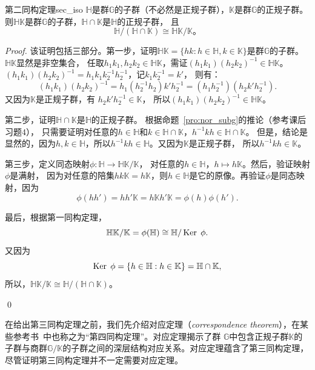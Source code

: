 \begin{theorem}{第二同构定理}{sec_iso}
$\mathbb{H}$是群$\mathbb{G}$的子群（不必然是正规子群），$\mathbb{K}$是群$\mathbb{G}$的正规子群。
则$\mathbb{H} \mathbb{K}$是群$\mathbb{G}$的子群，$\mathbb{H}\cap \mathbb{K}$是$\mathbb{H}$的正规子群，
且
\[\mathbb{H} / (\mathbb{H}\cap \mathbb{K}) \cong \mathbb{H}\mathbb{K}/\mathbb{K}\text{。}\]
\end{theorem}
\begin{proof}
该证明包括三部分。第一步，证明$\mathbb{H} \mathbb{K} = \{hk: h \in \mathbb{H}, k \in \mathbb{K}\}$是群$\mathbb{G}$的子群。
$\mathbb{H} \mathbb{K} $显然是非空集合，
任取$h_1 k_1 , h_2 k_2 \in \mathbb{H} \mathbb{K}$，需证$(h_1 k_1)  (h_2 k_2)^{-1} \in \mathbb{H} \mathbb{K}$。
$(h_1 k_1)  (h_2 k_2)^{-1} = h_1 k_1 k_2^{-1} h_2^{-1}$，记$k_1 k_2^{-1} = k'$，
则有：
\[ (h_1 k_1)  (h_2 k_2)^{-1} = h_1 (h_2^{-1} h_2) k' h_2^{-1} = (h_1 h_2^{-1}) (h_2 k' h_2^{-1}). \]
又因为$\mathbb{K}$是正规子群，有
$ h_2 k' h_2^{-1} \in \mathbb{K}$，
所以$(h_1 k_1)  (h_2 k_2)^{-1} \in \mathbb{H} \mathbb{K}$。

第二步，证明$\mathbb{H}\cap \mathbb{K}$是$\mathbb{H}$的正规子群。
根据命题~\ref{pro:nor_subg}的推论（参考课后习题$4$），
只需要证明对任意的$h\in \mathbb{H}$和$k \in \mathbb{H}\cap \mathbb{K}$，$h^{-1} k h \in \mathbb{H}\cap \mathbb{K}$。
但是，结论是显然的，因为$h, k \in \mathbb{H}$，所以$h^{-1} k h \in \mathbb{H}$。又因为$\mathbb{K}$是正规子群，
所以$h^{-1} k h \in \mathbb{K}$。

第三步，定义同态映射$\phi\colon \mathbb{H} \to \mathbb{H}\mathbb{K}/\mathbb{K}$，
对任意的$h\in \mathbb{H}$，$h \mapsto h \mathbb{K}$。然后，验证映射$\phi$是满射，
因为对任意的陪集$hk\mathbb{K}= h\mathbb{K}$，则$h \in \mathbb{H}$是它的原像。再验证$\phi$是同态映射，因为
\[ \phi(hh') =  hh' \mathbb{K} = h\mathbb{K}h'\mathbb{K} = \phi(h)\phi(h').\]

最后，根据第一同构定理，
\[ \mathbb{H}\mathbb{K}/\mathbb{K} = \phi(\mathbb{H}) \cong \mathbb{H}/\operatorname{Ker}\; \phi.\]
又因为
\[\operatorname{Ker}\; \phi = \{ h \in \mathbb{H}: h \in \mathbb{K}\} = \mathbb{H}\cap \mathbb{K} ,\]
所以，$\mathbb{H}\mathbb{K}/\mathbb{K}  \cong \mathbb{H}/(\mathbb{H}\cap \mathbb{K})$。

\qed
\end{proof}

在给出第三同构定理之前，我们先介绍对应定理（\emph{correspondence theorem}），在某些参考书~\cite{DF04}中也称之为“第四同构定理”。对应定理揭示了群 $\mathbb{G}$中包含正规子群$\mathbb{K}$的子群与商群$\mathbb{G}/\mathbb{K}$的子群之间的深层结构对应关系。对应定理蕴含了第三同构定理，尽管证明第三同构定理并不一定需要对应定理。

